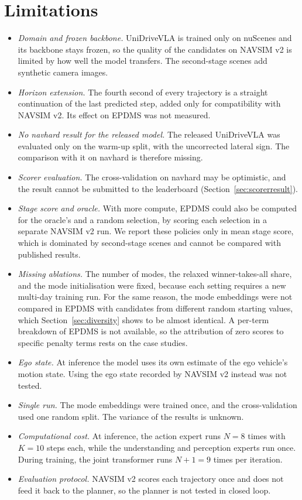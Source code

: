 \documentclass[11pt, a4paper, oneside]{book}
\begin{document}
\section{Limitations}
\label{sec:limits}
\begin{itemize}
  \item \emph{Domain and frozen backbone.} UniDriveVLA is trained only on nuScenes and its
  backbone stays frozen, so the quality of the candidates on NAVSIM v2 is limited by how well the
  model transfers. The second-stage scenes add synthetic camera images.
  \item \emph{Horizon extension.} The fourth second of every trajectory is a straight
  continuation of the last predicted step, added only for compatibility with NAVSIM v2. Its
  effect on EPDMS was not measured.
  \item \emph{No navhard result for the released model.} The released UniDriveVLA was evaluated
  only on the warm-up split, with the uncorrected lateral sign. The comparison with it on navhard
  is therefore missing.
  \item \emph{Scorer evaluation.} The cross-validation on navhard may be optimistic, and the
  result cannot be submitted to the leaderboard (Section~\ref{sec:scorerresult}).
  \item \emph{Stage score and oracle.} With more compute, EPDMS could also be computed for the
  oracle's and a random selection, by scoring each selection in a separate NAVSIM v2 run. We
  report these policies only in mean stage score, which is dominated by second-stage scenes and
  cannot be compared with published results.
  \item \emph{Missing ablations.} The number of modes, the relaxed winner-takes-all share, and
  the mode initialisation were fixed, because each setting requires a new multi-day training
  run. For the same reason, the mode embeddings were not compared in EPDMS with candidates from
  different random starting values, which Section~\ref{sec:diversity} shows to be almost
  identical. A per-term breakdown of EPDMS is not available, so the attribution of zero scores
  to specific penalty terms rests on the case studies.
  \item \emph{Ego state.} At inference the model uses its own estimate of the ego vehicle's
  motion state. Using the ego state recorded by NAVSIM v2 instead was not tested.
  \item \emph{Single run.} The mode embeddings were trained once, and the cross-validation used
  one random split. The variance of the results is unknown.
  \item \emph{Computational cost.} At inference, the action expert runs $N=8$ times with $K=10$
  steps each, while the understanding and perception experts run once. During training, the
  joint transformer runs $N+1=9$ times per iteration.
  \item \emph{Evaluation protocol.} NAVSIM v2 scores each trajectory once and does not feed it
  back to the planner, so the planner is not tested in closed loop.
\end{itemize}
\end{document}
